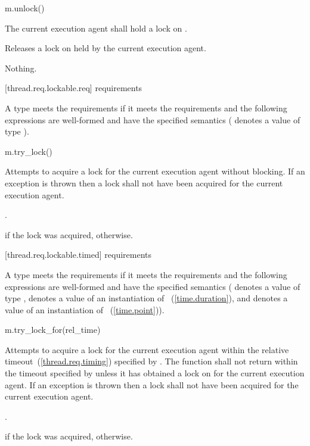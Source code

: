 \begin{itemdecl}
m.unlock()
\end{itemdecl}

\begin{itemdescr}
\pnum
\requires The current execution agent shall hold a lock on .

\pnum
\effects Releases a lock on  held by the current execution agent.

\pnum
\throws Nothing.
\end{itemdescr}

[thread.req.lockable.req]{ requirements}

\pnum
A type  meets the  requirements if it meets the 
requirements and the following expressions are well-formed and have the specified semantics
( denotes a value of type ).

\begin{itemdecl}
m.try_lock()
\end{itemdecl}

\begin{itemdescr}
\pnum
\effects Attempts to acquire a lock for the current execution agent without blocking. If an
exception is thrown then a lock shall not have been acquired for the current execution agent.

\pnum
\returntype {}.

\pnum
\returns {} if the lock was acquired,  otherwise.
\end{itemdescr}

[thread.req.lockable.timed]{ requirements}

\pnum
A type  meets the  requirements if it meets the 
requirements and the following expressions are well-formed and have the specified semantics
( denotes a value of type ,  denotes a value of an
instantiation of ~(\ref{time.duration}), and  denotes a value
of an instantiation of ~(\ref{time.point})).

\begin{itemdecl}
m.try_lock_for(rel_time)
\end{itemdecl}

\begin{itemdescr}
\pnum
\effects Attempts to acquire a lock for the current execution agent within the relative
timeout~(\ref{thread.req.timing}) specified by . The function shall not return
within the timeout specified by  unless it has obtained a lock on 
for the current execution agent. If an exception is thrown then a lock shall not have been
acquired for the current execution agent.

\pnum
\returntype {}.

\pnum
\returns {} if the lock was acquired,  otherwise.
\end{itemdescr}

